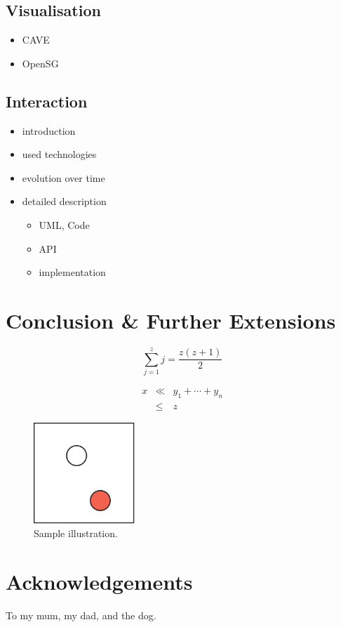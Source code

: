\documentclass[conference]{acmsiggraph}
\begin{document}
\subsection{Visualisation}
\begin{itemize}
\item CAVE
\item OpenSG
\end{itemize}

\subsection{Interaction}

\begin{itemize}
\item introduction
\item used technologies
\item evolution over time
\item{
	detailed description
	\begin{itemize}
	\item UML, Code
	\item API
	\item implementation
	\end{itemize}
}
\end{itemize}

\section{Conclusion \& Further Extensions}
\label{SEC:CFE}

\begin{equation}
 \sum_{j=1}^{z} j = \frac{z(z+1)}{2}
\end{equation}

\begin{eqnarray}
x & \ll & y_{1} + \cdots + y_{n} \\
  & \leq & z
\end{eqnarray}

\begin{figure}[ht]
  \centering
  \includegraphics[width=1.5in]{images/samplefigure}
  \caption{Sample illustration.}
  \label{FIG:SAMPLE}
\end{figure}

\section*{Acknowledgements}

To my mum, my dad, and the dog. 



\end{document}
